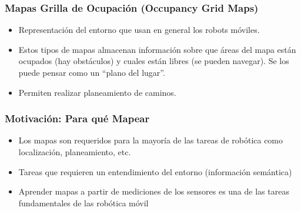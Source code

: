 \begin{frame}
    \frametitle{Mapas Grilla de Ocupación (Occupancy Grid Maps)}
    
    \begin{itemize}
    \item Representación del entorno que usan en general los robots móviles.
    \item Estos tipos de mapas almacenan información sobre que áreas del mapa están ocupados (hay obstáculos) y cuales están libres (se pueden navegar). Se los puede pensar como un ``plano del lugar''.
    \item Permiten realizar planeamiento de caminos.
    \end{itemize}
   
\end{frame}

\begin{frame}
    \frametitle{Motivación: Para qué Mapear}
    
    \begin{itemize}
        \item Los mapas son requeridos para la mayoría de las tareas de robótica como localización, planeamiento, etc.
        \item Tareas que requieren un entendimiento del entorno (información semántica)
        \item Aprender mapas a partir de mediciones de los sensores es una de las tareas fundamentales de las robótica móvil
    \end{itemize}
    
\end{frame}

